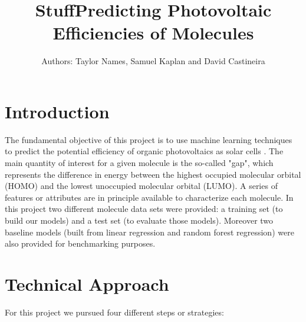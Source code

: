\documentclass{article}
\title{\vspace{-1.0cm}Stuff}
\title{Predicting Photovoltaic Efficiencies of Molecules} %
\author{Authors: Taylor Names, Samuel Kaplan and David Castineira} %
\date{\vspace{-5ex}}  %
\begin{document}
\maketitle %



\section*{Introduction}

The fundamental objective of this project is to use machine learning techniques to predict the potential efficiency of organic photovoltaics as solar cells . The main quantity of interest for a given molecule is the so-called "gap", which represents the difference in energy between the highest occupied molecular orbital (HOMO) and the lowest unoccupied molecular orbital (LUMO). A series of features or attributes are in principle available to characterize each molecule. In this project two different molecule data sets were provided: a training set (to build our models) and a test set (to evaluate those models). Moreover two baseline models (built from linear regression and random forest regression) were also provided for benchmarking purposes. 


\section{Technical Approach}

For this project we pursued four different steps or strategies: 
\end{document}
